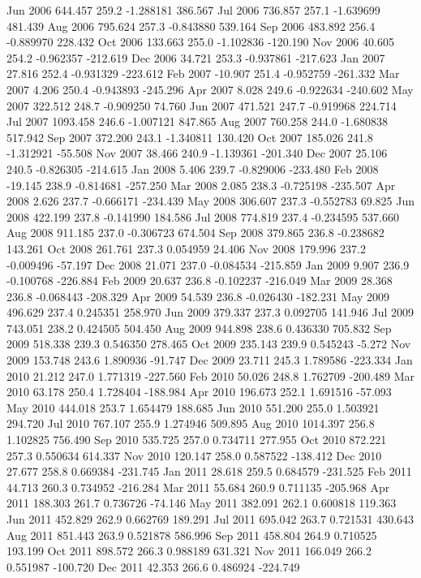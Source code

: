 \documentclass{article}\usepackage{graphicx, color}
\begin{document}
\begin{center}
\begin{Schunk}
\begin{Soutput}
Jun 2006  644.457 259.2 -1.288181  386.567
Jul 2006  736.857 257.1 -1.639699  481.439
Aug 2006  795.624 257.3 -0.843880  539.164
Sep 2006  483.892 256.4 -0.889970  228.432
Oct 2006  133.663 255.0 -1.102836 -120.190
Nov 2006   40.605 254.2 -0.962357 -212.619
Dec 2006   34.721 253.3 -0.937861 -217.623
Jan 2007   27.816 252.4 -0.931329 -223.612
Feb 2007  -10.907 251.4 -0.952759 -261.332
Mar 2007    4.206 250.4 -0.943893 -245.296
Apr 2007    8.028 249.6 -0.922634 -240.602
May 2007  322.512 248.7 -0.909250   74.760
Jun 2007  471.521 247.7 -0.919968  224.714
Jul 2007 1093.458 246.6 -1.007121  847.865
Aug 2007  760.258 244.0 -1.680838  517.942
Sep 2007  372.200 243.1 -1.340811  130.420
Oct 2007  185.026 241.8 -1.312921  -55.508
Nov 2007   38.466 240.9 -1.139361 -201.340
Dec 2007   25.106 240.5 -0.826305 -214.615
Jan 2008    5.406 239.7 -0.829006 -233.480
Feb 2008  -19.145 238.9 -0.814681 -257.250
Mar 2008    2.085 238.3 -0.725198 -235.507
Apr 2008    2.626 237.7 -0.666171 -234.439
May 2008  306.607 237.3 -0.552783   69.825
Jun 2008  422.199 237.8 -0.141990  184.586
Jul 2008  774.819 237.4 -0.234595  537.660
Aug 2008  911.185 237.0 -0.306723  674.504
Sep 2008  379.865 236.8 -0.238682  143.261
Oct 2008  261.761 237.3  0.054959   24.406
Nov 2008  179.996 237.2 -0.009496  -57.197
Dec 2008   21.071 237.0 -0.084534 -215.859
Jan 2009    9.907 236.9 -0.100768 -226.884
Feb 2009   20.637 236.8 -0.102237 -216.049
Mar 2009   28.368 236.8 -0.068443 -208.329
Apr 2009   54.539 236.8 -0.026430 -182.231
May 2009  496.629 237.4  0.245351  258.970
Jun 2009  379.337 237.3  0.092705  141.946
Jul 2009  743.051 238.2  0.424505  504.450
Aug 2009  944.898 238.6  0.436330  705.832
Sep 2009  518.338 239.3  0.546350  278.465
Oct 2009  235.143 239.9  0.545243   -5.272
Nov 2009  153.748 243.6  1.890936  -91.747
Dec 2009   23.711 245.3  1.789586 -223.334
Jan 2010   21.212 247.0  1.771319 -227.560
Feb 2010   50.026 248.8  1.762709 -200.489
Mar 2010   63.178 250.4  1.728404 -188.984
Apr 2010  196.673 252.1  1.691516  -57.093
May 2010  444.018 253.7  1.654479  188.685
Jun 2010  551.200 255.0  1.503921  294.720
Jul 2010  767.107 255.9  1.274946  509.895
Aug 2010 1014.397 256.8  1.102825  756.490
Sep 2010  535.725 257.0  0.734711  277.955
Oct 2010  872.221 257.3  0.550634  614.337
Nov 2010  120.147 258.0  0.587522 -138.412
Dec 2010   27.677 258.8  0.669384 -231.745
Jan 2011   28.618 259.5  0.684579 -231.525
Feb 2011   44.713 260.3  0.734952 -216.284
Mar 2011   55.684 260.9  0.711135 -205.968
Apr 2011  188.303 261.7  0.736726  -74.146
May 2011  382.091 262.1  0.600818  119.363
Jun 2011  452.829 262.9  0.662769  189.291
Jul 2011  695.042 263.7  0.721531  430.643
Aug 2011  851.443 263.9  0.521878  586.996
Sep 2011  458.804 264.9  0.710525  193.199
Oct 2011  898.572 266.3  0.988189  631.321
Nov 2011  166.049 266.2  0.551987 -100.720
Dec 2011   42.353 266.6  0.486924 -224.749
\end{Soutput}
\end{Schunk}

\end{center}
\end{document}
